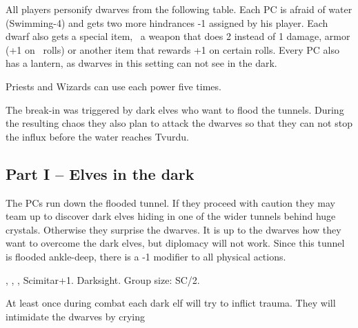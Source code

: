 {	

		\noindent
		All players personify dwarves from the following table. Each PC is afraid of water (Swimming-4) and gets two more hindrances -1 assigned by his player. Each dwarf also gets a special item, \eg\ a weapon that does 2 instead of 1 damage, armor (+1 on \RD\ rolls) or another item that rewards +1 on certain rolls. Every PC also has a lantern, as dwarves in this setting can not see in the dark.


		\noindent
		Priests and Wizards can use each power five times.


		\noindent
		The break-in was triggered by dark elves who want to flood the tunnels. During the resulting chaos they also plan to attack the dwarves so that they can not stop the influx before the water reaches Tvurdu.

		\subsection{Part I -- Elves in the dark}

		\noindent
		The PCs run down the flooded tunnel. If they proceed with caution they may team up  to discover dark elves hiding in one of the wider tunnels behind huge crystals. Otherwise they surprise the dwarves. It is up to the dwarves how they want to overcome the dark elves, but diplomacy will not work. Since this tunnel is flooded ankle-deep, there is a -1 modifier to all physical actions.

		 , , , Scimitar+1. Darksight. Group size: SC/2.

		At least once during combat each dark elf will try to inflict trauma. They will intimidate the dwarves by crying 

}
